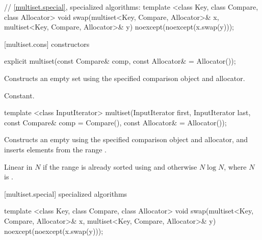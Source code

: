 \begin{codeblock}
{  // \ref{multiset.special}, specialized algorithms:
  template <class Key, class Compare, class Allocator>
    void swap(multiset<Key, Compare, Allocator>& x,
              multiset<Key, Compare, Allocator>& y)
      noexcept(noexcept(x.swap(y)));
}
\end{codeblock}%
%

[multiset.cons]{ constructors}

%
%
\begin{itemdecl}
explicit multiset(const Compare& comp, const Allocator& = Allocator());
\end{itemdecl}

\begin{itemdescr}
\pnum
\effects
Constructs an empty set using the specified comparison object and allocator.

\pnum
\complexity
Constant.
\end{itemdescr}

%
%
\begin{itemdecl}
template <class InputIterator>
  multiset(InputIterator first, InputIterator last,
           const Compare& comp = Compare(), const Allocator& = Allocator());
\end{itemdecl}

\begin{itemdescr}
\pnum
\effects
Constructs an empty
using the specified comparison object and allocator,
and inserts elements from the range
.

\pnum
\complexity
Linear in $N$
if the range
is already sorted using  and otherwise $N \log{N}$,
where $N$ is
.
\end{itemdescr}

[multiset.special]{ specialized algorithms}

%
%
\begin{itemdecl}
template <class Key, class Compare, class Allocator>
  void swap(multiset<Key, Compare, Allocator>& x,
            multiset<Key, Compare, Allocator>& y)
    noexcept(noexcept(x.swap(y)));
\end{itemdecl}

